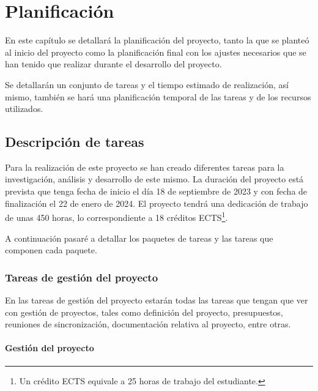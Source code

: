 \chapter{Planificación}
\label{cap:planificacion}


En este capítulo se detallará la planificación del proyecto, tanto la que se planteó
al inicio del proyecto como la planificación final con los ajustes necesarios que se
han tenido que realizar durante el desarrollo del proyecto.

Se detallarán un conjunto de tareas y el tiempo estimado de realización, así mismo,
también se hará una planificación temporal de las tareas y de los recursos utilizados.

\section{Descripción de tareas}
\label{sec:descripcion_tareas}


Para la realización de este proyecto se han creado diferentes tareas para la
investigación, análisis y desarrollo de este mismo. La duración del proyecto
está prevista que tenga fecha de inicio el día 18 de septiembre de 2023 y con fecha
de finalización el 22 de enero de 2024. El proyecto tendrá una dedicación de trabajo
de unas 450 horas, lo correspondiente a 18 créditos ECTS\footnote{Un crédito ECTS
equivale a 25 horas de trabajo del estudiante.\cite{ECTS}}.

A continuación pasaré a detallar los paquetes de tareas y las tareas que componen
cada paquete.

\subsection{Tareas de gestión del proyecto}
\label{subsec:tareas_gestion}


En las tareas de gestión del proyecto estarán todas las tareas que tengan que
ver con gestión de proyectos, tales como definición del proyecto, presupuestos,
reuniones de sincronización, documentación relativa al proyecto, entre otras.

\subsubsection{Gestión del proyecto}
\label{subsubsec:tareas_gestion}


